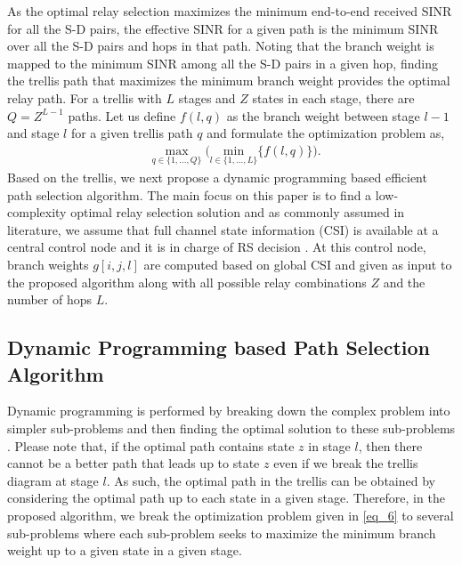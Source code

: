 \documentclass[12pt,draftclsnofoot,onecolumn]{IEEEtran}
\begin{document}
	As the optimal relay selection maximizes the minimum end-to-end received SINR for all the S-D pairs, the effective SINR for a given path is the minimum SINR over all the S-D pairs and hops in that path. Noting that the branch weight is mapped to the minimum SINR among all the S-D pairs in a given hop, finding the trellis path that maximizes the minimum branch weight provides the optimal relay path. For a trellis with $L$ stages and $Z$ states in each stage, there are $Q=Z^{L-1}$ paths. Let us define $f(l,q)$ as the branch weight between stage $l-1$ and stage $l$ for a given trellis path $q$ and formulate the optimization problem as,
	\begin{align}\label{eq_6}
	&{\underset{q\in\{1,...,Q\}}{\textrm{max}}}\;\bigg({\underset{l \in \{1,...,L\}} {\textrm{min}}}\{f(l,q)\}\bigg). 
	\end{align}
	Based on the trellis, we next propose a dynamic programming based efficient path selection algorithm. The main focus on this paper is to find a low-complexity optimal relay selection solution and as commonly assumed in literature, we assume that full channel state information (CSI) is available at a central control node and it is in charge of RS decision \cite{electronics9030443, 2809748, 2941932}. At this control node, branch weights $g[i,j,l]$ are computed based on global CSI and given as input to the proposed algorithm along with all possible relay combinations $Z$ and the number of hops $L$.
	
	\subsection{Dynamic Programming based Path Selection Algorithm}\label{Sec-algo} 
	Dynamic programming is performed by breaking down the complex problem into simpler sub-problems and then finding the optimal solution to these sub-problems \cite{130145}. Please note that, if the optimal path contains state $z$ in stage $l$, then there cannot be a better path that leads up to state $z$ even if we break the trellis diagram at stage $l$. As such, the optimal path in the trellis can be obtained by considering the optimal path up to each state in a given stage. Therefore, in the proposed algorithm, we break the optimization problem given in \eqref{eq_6} to several sub-problems where each sub-problem seeks to maximize the minimum branch weight up to a given state in a given stage. 
	
\end{document}
